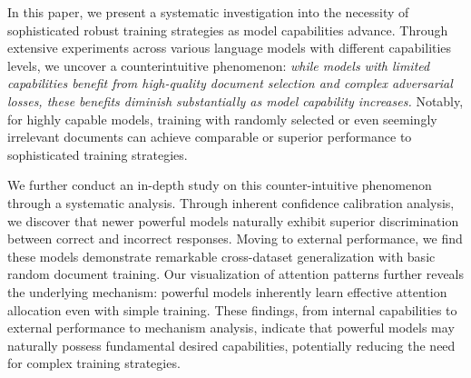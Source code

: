 In this paper, we present a systematic investigation into the necessity of sophisticated robust training strategies as model capabilities advance. Through extensive experiments across various language models with different capabilities levels, we uncover a counterintuitive phenomenon: \emph{while models with limited capabilities benefit from high-quality document selection and complex adversarial losses, these benefits diminish substantially as model capability increases.} Notably, for highly capable models, training with randomly selected or even seemingly irrelevant documents can achieve comparable or superior performance to sophisticated training strategies.

We further conduct an in-depth study on this counter-intuitive phenomenon through a systematic analysis. Through inherent confidence calibration analysis, we discover that newer powerful models naturally exhibit superior discrimination between correct and incorrect responses. Moving to external performance, we find these models demonstrate remarkable cross-dataset generalization with basic random document training. Our visualization of attention patterns further reveals the underlying mechanism: powerful models inherently learn effective attention allocation even with simple training. These findings, from internal capabilities to external performance to mechanism analysis, indicate that powerful models may naturally possess fundamental desired capabilities, potentially reducing the need for complex training strategies.


